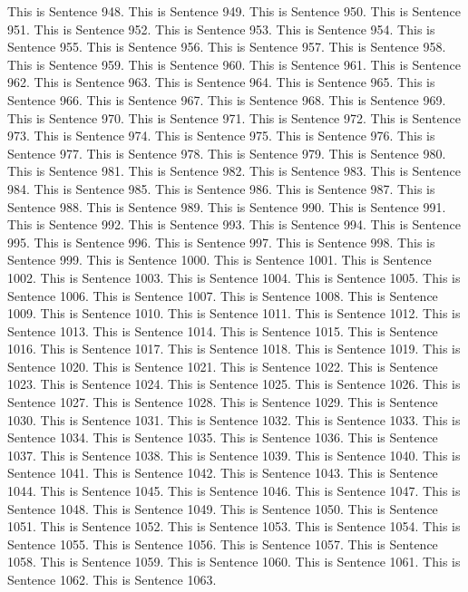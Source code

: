 \documentclass{article}
\begin{document}
This is Sentence 948.
This is Sentence 949.
This is Sentence 950.
This is Sentence 951.
This is Sentence 952.
This is Sentence 953.
This is Sentence 954.
This is Sentence 955.
This is Sentence 956.
This is Sentence 957.
This is Sentence 958.
This is Sentence 959.
This is Sentence 960.
This is Sentence 961.
This is Sentence 962.
This is Sentence 963.
This is Sentence 964.
This is Sentence 965.
This is Sentence 966.
This is Sentence 967.
This is Sentence 968.
This is Sentence 969.
This is Sentence 970.
This is Sentence 971.
This is Sentence 972.
This is Sentence 973.
This is Sentence 974.
This is Sentence 975.
This is Sentence 976.
This is Sentence 977.
This is Sentence 978.
This is Sentence 979.
This is Sentence 980.
This is Sentence 981.
This is Sentence 982.
This is Sentence 983.
This is Sentence 984.
This is Sentence 985.
This is Sentence 986.
This is Sentence 987.
This is Sentence 988.
This is Sentence 989.
This is Sentence 990.
This is Sentence 991.
This is Sentence 992.
This is Sentence 993.
This is Sentence 994.
This is Sentence 995.
This is Sentence 996.
This is Sentence 997.
This is Sentence 998.
This is Sentence 999.
This is Sentence 1000.
This is Sentence 1001.
This is Sentence 1002.
This is Sentence 1003.
This is Sentence 1004.
This is Sentence 1005.
This is Sentence 1006.
This is Sentence 1007.
This is Sentence 1008.
This is Sentence 1009.
This is Sentence 1010.
This is Sentence 1011.
This is Sentence 1012.
This is Sentence 1013.
This is Sentence 1014.
This is Sentence 1015.
This is Sentence 1016.
This is Sentence 1017.
This is Sentence 1018.
This is Sentence 1019.
This is Sentence 1020.
This is Sentence 1021.
This is Sentence 1022.
This is Sentence 1023.
This is Sentence 1024.
This is Sentence 1025.
This is Sentence 1026.
This is Sentence 1027.
This is Sentence 1028.
This is Sentence 1029.
This is Sentence 1030.
This is Sentence 1031.
This is Sentence 1032.
This is Sentence 1033.
This is Sentence 1034.
This is Sentence 1035.
This is Sentence 1036.
This is Sentence 1037.
This is Sentence 1038.
This is Sentence 1039.
This is Sentence 1040.
This is Sentence 1041.
This is Sentence 1042.
This is Sentence 1043.
This is Sentence 1044.
This is Sentence 1045.
This is Sentence 1046.
This is Sentence 1047.
This is Sentence 1048.
This is Sentence 1049.
This is Sentence 1050.
This is Sentence 1051.
This is Sentence 1052.
This is Sentence 1053.
This is Sentence 1054.
This is Sentence 1055.
This is Sentence 1056.
This is Sentence 1057.
This is Sentence 1058.
This is Sentence 1059.
This is Sentence 1060.
This is Sentence 1061.
This is Sentence 1062.
This is Sentence 1063.
\end{document}

